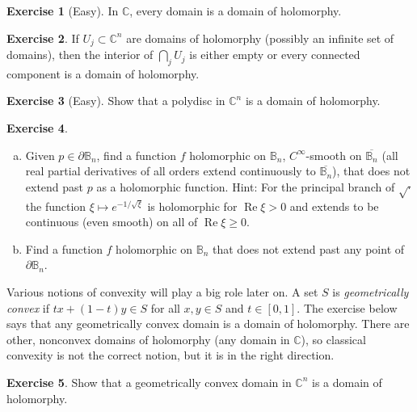 \documentclass[12pt,openany]{book}
\renewcommand{\Re}{\operatorname{Re}}
\newcommand{\C}{{\mathbb{C}}}
\newcommand{\bB}{{\mathbb{B}}}
\newcommand{\myindex}[1]{#1\index{#1}}
\theoremstyle{plain}
\theoremstyle{remark}
\theoremstyle{definition}
\newenvironment{exbox}{%
    \def\FrameCommand{\vrule width 1pt \relax\hspace {10pt}}%
    \MakeFramed {\advance \hsize -\width \FrameRestore }%
}{%
    \endMakeFramed
}
\newenvironment{exparts}{%
    \leavevmode\begin{enumerate}[a),noitemsep,topsep=0pt,parsep=0pt,partopsep=0pt]
}{%
    \end{enumerate}
}
\theoremstyle{exercise}
\newtheorem{exercise}{Exercise}[section]
\theoremstyle{example}
\begin{document}
\begin{exbox}
\begin{exercise}[Easy]
In $\C$, every domain is a domain of holomorphy.
\end{exercise}

\begin{exercise}
If $U_j \subset \C^n$ are domains of holomorphy (possibly an infinite set of
domains), then the interior of
$\bigcap_{j} U_j$
is either empty or every connected component is a domain of holomorphy.
\pagebreak[1]
\end{exercise}

\begin{exercise}[Easy]
Show that a polydisc in $\C^n$ is a domain of holomorphy.
\end{exercise}

\begin{exercise}
\begin{exparts}
\item
Given $p \in \partial \bB_n$, find a function $f$ holomorphic on
$\bB_n$,
$C^\infty$-smooth on $\overline{\bB_n}$ (all real partial derivatives of
all orders extend
continuously to $\overline{\bB_n}$), that does not extend past $p$
as a holomorphic function.
Hint: For the principal branch of $\sqrt{\cdot}$ the function $\xi \mapsto
e^{-1/\sqrt{\xi}}$ is holomorphic for $\Re \xi > 0$ and extends to
be continuous (even smooth) on all of $\Re \xi \geq 0$.
\item
Find a function $f$ holomorphic on $\bB_n$
that does not extend past any point of
$\partial \bB_n$.
\end{exparts}
\end{exercise}
\end{exbox}

Various notions of convexity will play a big role later on.
A set $S$ is \emph{\myindex{geometrically convex}}
if $t x + (1-t)y \in S$ 
for all $x,y \in S$ and $t \in [0,1]$.
The exercise below
says that any geometrically convex domain is a domain of holomorphy.
There are other,
nonconvex domains of holomorphy (any domain in $\C$),
so classical convexity is not the correct notion, but it is
in the right direction.

\begin{exbox}
\begin{exercise}
Show that a geometrically convex domain in $\C^n$ is a domain of holomorphy.
\end{exercise}
\end{exbox}
\end{document}
